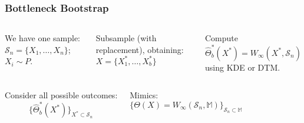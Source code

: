 \begin{frame}
    \frametitle{Bottleneck Bootstrap}

    \begin{columns}

        \begin{block}{}
            We have one sample: $\mathcal{S}_n = \{ X_1, \ldots, X_n\}$; $X_i \sim P$.
        \end{block}

        \pause

        \begin{block}{}
            Subsample (with replacement), obtaining:
            $X = \{ X_1^*, \ldots, X_b^*\}$
        \end{block}

        \pause

        \begin{block}{}
            Compute
            $\hat{\Theta}_b^*(X^*) =
            W_{\infty}(X^*,\mathcal{S}_n)$ using KDE or DTM.
        \end{block}

        \centering

    \end{columns}

    \pause
    \begin{columns}
        \begin{block}{}
            Consider all possible outcomes:
            $$ \{ \hat{\Theta}_{b}^*(X^*) \}_{X^* \subset \mathcal{S}_n}$$
        \end{block}

        \pause
        \begin{block}{}
            Mimics:
            $$ \{ {\Theta}(X) = W_{\infty}(\mathcal{S}_n,\mathbb{M}) \}_{\mathcal{S}_n
            \subset \mathbb{M}}$$
        \end{block}
    \end{columns}
\end{frame}



